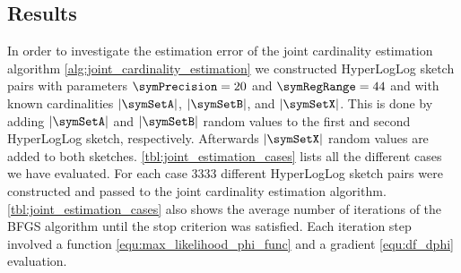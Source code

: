 \documentclass[a4paper]{scrartcl}
\newcommand{\comm}[2]{{\Comment{\parbox[t]{#1\linewidth}{{#2}}}}}
\begin{document}
\begin{algorithm}
\end{algorithm}


\subsection{Results}
In order to investigate the estimation error of the joint cardinality estimation algorithm \cref{alg:joint_cardinality_estimation} we constructed HyperLogLog sketch pairs with parameters $$ and $$ and with known cardinalities $|\symSetA|$, $|\symSetB|$, and $|\symSetX|$. This is done by adding $|\symSetA|$ and $|\symSetB|$ random values to the first and second HyperLogLog sketch, respectively. Afterwards 
$|\symSetX|$ random values are added to both sketches. \cref{tbl:joint_estimation_cases} lists all the different cases we have evaluated. For each case \num{3333} different HyperLogLog sketch pairs were constructed and passed to the joint cardinality estimation algorithm. 
\cref{tbl:joint_estimation_cases} also shows the average number of iterations of the BFGS algorithm until the stop criterion was satisfied. Each iteration step involved a function \eqref{equ:max_likelihood_phi_func} and a gradient \eqref{equ:df_dphi} evaluation.
\end{document}
